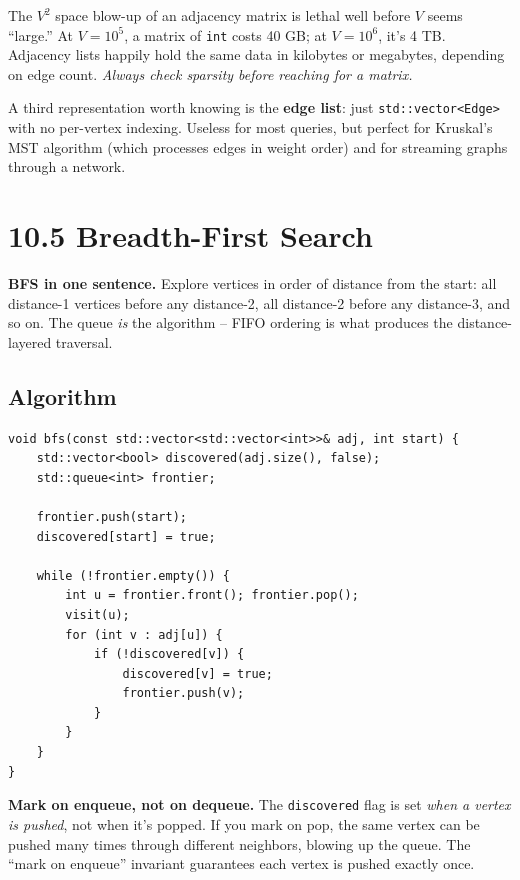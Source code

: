 \documentclass[11pt]{article}
\begin{document}
\begin{warnbox}
The $V^2$ space blow-up of an adjacency matrix is lethal well before $V$ seems ``large.'' At $V = 10^5$, a matrix of \texttt{int} costs 40 GB; at $V = 10^6$, it's 4 TB. Adjacency lists happily hold the same data in kilobytes or megabytes, depending on edge count. \emph{Always check sparsity before reaching for a matrix.}
\end{warnbox}

\begin{notebox}
A third representation worth knowing is the \textbf{edge list}: just \texttt{std::vector<Edge>} with no per-vertex indexing. Useless for most queries, but perfect for Kruskal's MST algorithm (which processes edges in weight order) and for streaming graphs through a network.
\end{notebox}

\section{10.5 Breadth-First Search}

\begin{ideabox}
\textbf{BFS in one sentence.} Explore vertices in order of distance from the start: all distance-1 vertices before any distance-2, all distance-2 before any distance-3, and so on. The queue \emph{is} the algorithm -- FIFO ordering is what produces the distance-layered traversal.
\end{ideabox}

\subsection*{Algorithm}

\begin{lstlisting}[basicstyle=\ttfamily\small,frame=single]
void bfs(const std::vector<std::vector<int>>& adj, int start) {
    std::vector<bool> discovered(adj.size(), false);
    std::queue<int> frontier;

    frontier.push(start);
    discovered[start] = true;

    while (!frontier.empty()) {
        int u = frontier.front(); frontier.pop();
        visit(u);
        for (int v : adj[u]) {
            if (!discovered[v]) {
                discovered[v] = true;
                frontier.push(v);
            }
        }
    }
}
\end{lstlisting}

\begin{warnbox}
\textbf{Mark on enqueue, not on dequeue.} The \texttt{discovered} flag is set \emph{when a vertex is pushed}, not when it's popped. If you mark on pop, the same vertex can be pushed many times through different neighbors, blowing up the queue. The ``mark on enqueue'' invariant guarantees each vertex is pushed exactly once.
\end{warnbox}
\end{document}

